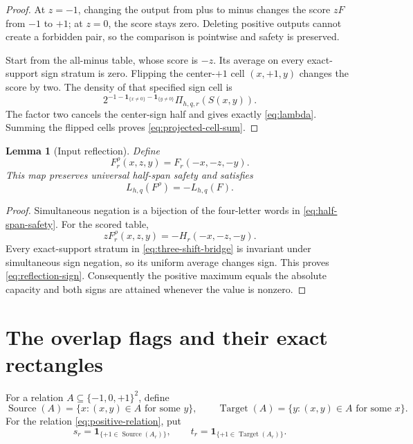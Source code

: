 \documentclass[11pt]{article}
\newtheorem{lemma}[theorem]{Lemma}
\theoremstyle{definition}
\theoremstyle{remark}
\newcommand{\ind}{\mathbf 1}
\newcommand{\T}{\{-1,0,+1\}}
\newcommand{\Source}{\operatorname{Source}}
\newcommand{\Target}{\operatorname{Target}}
\begin{document}
\begin{proof}
At \(z=-1\), changing the output from plus to minus changes the score
\(zF\) from \(-1\) to \(+1\); at \(z=0\), the score stays zero.
Deleting positive outputs cannot create a forbidden pair, so the comparison
is pointwise and safety is preserved.

Start from the all-minus table, whose score is \(-z\).  Its average on every
exact-support sign stratum is zero.  Flipping the center-\(+1\) cell
\((x,+1,y)\) changes the score by two.  The density of that specified sign
cell is
\[
 2^{-1-\ind_{\{x\ne0\}}-\ind_{\{y\ne0\}}}
 \Pi_{h,q,r}(S(x,y)).
\]
The factor two cancels the center-sign half and gives exactly
\eqref{eq:lambda}.  Summing the flipped cells proves
\eqref{eq:projected-cell-sum}.
\end{proof}

\begin{lemma}[Input reflection]
\label{lem:input-reflection}
Define
\[
 F^\rho_r(x,z,y)=F_r(-x,-z,-y).
\]
This map preserves universal half-span safety and satisfies
\begin{equation}
 L_{h,q}(F^\rho)=-L_{h,q}(F).
 \label{eq:reflection-sign}
\end{equation}
\end{lemma}

\begin{proof}
Simultaneous negation is a bijection of the four-letter words in
\eqref{eq:half-span-safety}.  For the scored table,
\[
 zF^\rho_r(x,z,y)=-H_r(-x,-z,-y).
\]
Every exact-support stratum in \eqref{eq:three-shift-bridge} is invariant
under simultaneous sign negation, so its uniform average changes sign.
This proves \eqref{eq:reflection-sign}.  Consequently the positive maximum
equals the absolute capacity and both signs are attained whenever the value
is nonzero.
\end{proof}

\section{The overlap flags and their exact rectangles}

For a relation \(A\subseteq\T^2\), define
\[
 \Source(A)=\{x:(x,y)\in A\text{ for some }y\},\qquad
 \Target(A)=\{y:(x,y)\in A\text{ for some }x\}.
\]
For the relation \eqref{eq:positive-relation}, put
\begin{equation}
 s_r=\ind_{\{+1\in\Source(A_r)\}},\qquad
 t_r=\ind_{\{+1\in\Target(A_r)\}}.
 \label{eq:source-target-flags}
\end{equation}
\end{document}
